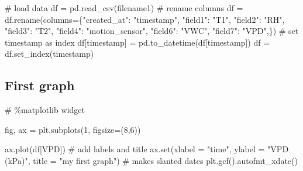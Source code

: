 \documentclass[
  letterpaper,
  DIV=11,
  numbers=noendperiod,
  oneside]{scrreprt}
\newenvironment{Shaded}{\begin{snugshade}}{\end{snugshade}}
\newcommand{\BuiltInTok}[1]{\textcolor[rgb]{0.00,0.23,0.31}{#1}}
\newcommand{\CommentTok}[1]{\textcolor[rgb]{0.37,0.37,0.37}{#1}}
\newcommand{\DecValTok}[1]{\textcolor[rgb]{0.68,0.00,0.00}{#1}}
\newcommand{\NormalTok}[1]{\textcolor[rgb]{0.00,0.23,0.31}{#1}}
\newcommand{\OperatorTok}[1]{\textcolor[rgb]{0.37,0.37,0.37}{#1}}
\newcommand{\StringTok}[1]{\textcolor[rgb]{0.13,0.47,0.30}{#1}}
\begin{document}
\begin{Shaded}
\begin{Highlighting}[]
\CommentTok{\# load data}
\NormalTok{df }\OperatorTok{=}\NormalTok{ pd.read\_csv(filename1)}
\CommentTok{\# rename columns}
\NormalTok{df }\OperatorTok{=}\NormalTok{ df.rename(columns}\OperatorTok{=}\NormalTok{\{}\StringTok{"created\_at"}\NormalTok{: }\StringTok{"timestamp"}\NormalTok{,}
                        \StringTok{"field1"}\NormalTok{: }\StringTok{"T1"}\NormalTok{,}
                        \StringTok{"field2"}\NormalTok{: }\StringTok{"RH"}\NormalTok{,}
                        \StringTok{"field3"}\NormalTok{: }\StringTok{"T2"}\NormalTok{,}
                        \StringTok{"field4"}\NormalTok{: }\StringTok{"motion\_sensor"}\NormalTok{,}
                        \StringTok{"field6"}\NormalTok{: }\StringTok{"VWC"}\NormalTok{,}
                        \StringTok{"field7"}\NormalTok{: }\StringTok{"VPD"}\NormalTok{,\})}
\CommentTok{\# set timestamp as index}
\NormalTok{df[}\StringTok{\textquotesingle{}timestamp\textquotesingle{}}\NormalTok{] }\OperatorTok{=}\NormalTok{ pd.to\_datetime(df[}\StringTok{\textquotesingle{}timestamp\textquotesingle{}}\NormalTok{])}
\NormalTok{df }\OperatorTok{=}\NormalTok{ df.set\_index(}\StringTok{\textquotesingle{}timestamp\textquotesingle{}}\NormalTok{)}
\end{Highlighting}
\end{Shaded}

\hypertarget{first-graph}{%
\subsection{First graph}\label{first-graph}}

\begin{Shaded}
\begin{Highlighting}[]
\CommentTok{\# \%matplotlib widget}

\NormalTok{fig, ax }\OperatorTok{=}\NormalTok{ plt.subplots(}\DecValTok{1}\NormalTok{, figsize}\OperatorTok{=}\NormalTok{(}\DecValTok{8}\NormalTok{,}\DecValTok{6}\NormalTok{))}

\NormalTok{ax.plot(df[}\StringTok{\textquotesingle{}VPD\textquotesingle{}}\NormalTok{])}
\CommentTok{\# add labels and title}
\NormalTok{ax.}\BuiltInTok{set}\NormalTok{(xlabel }\OperatorTok{=} \StringTok{"time"}\NormalTok{,}
\NormalTok{       ylabel }\OperatorTok{=} \StringTok{"VPD (kPa)"}\NormalTok{,}
\NormalTok{       title }\OperatorTok{=} \StringTok{"my first graph"}\NormalTok{)}
\CommentTok{\# makes slanted dates}
\NormalTok{plt.gcf().autofmt\_xdate()  }
\end{Highlighting}
\end{Shaded}
\end{document}
